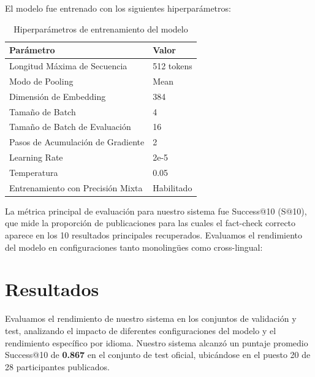 \documentclass[11pt]{article}
\begin{document}
El modelo fue entrenado con los siguientes hiperparámetros:

\begin{table}[h]
\centering
\small
\begin{tabular}{ll}
\hline
\textbf{Parámetro} & \textbf{Valor} \\
\hline
Longitud Máxima de Secuencia & 512 tokens \\
Modo de Pooling & Mean \\
Dimensión de Embedding & 384 \\
Tamaño de Batch & 4 \\
Tamaño de Batch de Evaluación & 16 \\
Pasos de Acumulación de Gradiente & 2 \\
Learning Rate & 2e-5 \\
Temperatura & 0.05 \\
Entrenamiento con Precisión Mixta & Habilitado \\
\hline
\end{tabular}
\caption{Hiperparámetros de entrenamiento del modelo}
\label{tab:hyperparams}
\end{table}

La métrica principal de evaluación para nuestro sistema fue Success@10 (S@10), que mide la proporción de publicaciones para las cuales el fact-check correcto aparece en los 10 resultados principales recuperados. Evaluamos el rendimiento del modelo en configuraciones tanto monolingües como cross-lingual:

\section{Resultados}

Evaluamos el rendimiento de nuestro sistema en los conjuntos de validación y test, analizando el impacto de diferentes configuraciones del modelo y el rendimiento específico por idioma. Nuestro sistema alcanzó un puntaje promedio Success@10 de \textbf{0.867} en el conjunto de test oficial, ubicándose en el puesto 20 de 28 participantes publicados.
\end{document}
